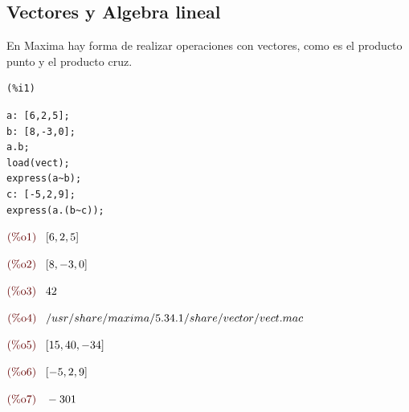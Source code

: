 \documentclass[12pt]{article}
\begin{document}
\subsection{Vectores y Algebra lineal}
En Maxima hay forma de realizar operaciones con vectores, como es el producto punto y el producto cruz.

\noindent

\begin{minipage}[t]{8ex}{\color{red}\bf
\begin{verbatim}
(%i1) 
\end{verbatim}}
\end{minipage}
\begin{minipage}[t]{\textwidth}{\color{blue}
\begin{verbatim}
a: [6,2,5];
b: [8,-3,0];
a.b;
load(vect);
express(a~b);
c: [-5,2,9];
express(a.(b~c));
\end{verbatim}}
\end{minipage}

\begin{math}\displaystyle
\parbox{8ex}{\color{labelcolor}(\%o1) }
[6,2,5]
\end{math}

\begin{math}\displaystyle
\parbox{8ex}{\color{labelcolor}(\%o2) }
[8,-3,0]
\end{math}

\begin{math}\displaystyle
\parbox{8ex}{\color{labelcolor}(\%o3) }
42
\end{math}

\begin{math}\displaystyle
\parbox{8ex}{\color{labelcolor}(\%o4) }
/usr/share/maxima/5.34.1/share/vector/vect.mac
\end{math}

\begin{math}\displaystyle
\parbox{8ex}{\color{labelcolor}(\%o5) }
[15,40,-34]
\end{math}

\begin{math}\displaystyle
\parbox{8ex}{\color{labelcolor}(\%o6) }
[-5,2,9]
\end{math}

\begin{math}\displaystyle
\parbox{8ex}{\color{labelcolor}(\%o7) }
-301
\end{math}

\end{document}
